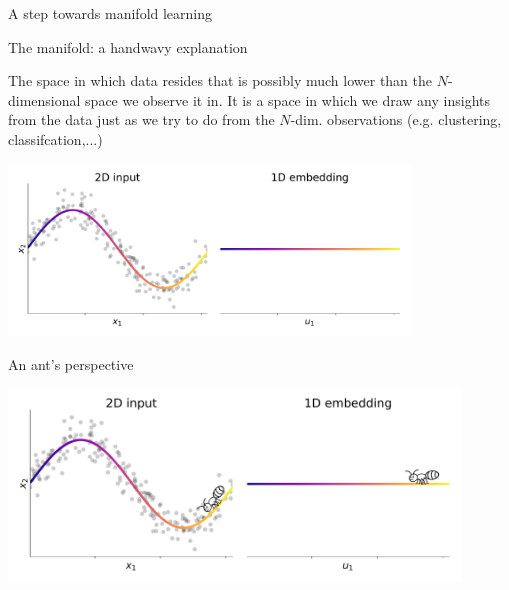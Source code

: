 \begin{frame}{A step towards manifold learning}

\begin{block}{The manifold: a handwavy explanation}

The space in which data resides that is possibly much lower than the $N$-dimensional space we observe it in.
It is a space in which we draw any insights from the data just as we try to do from the $N$-dim. observations (e.g. clustering, classifcation,...)

\end{block}

\pause

\begin{center}
	\includegraphics[width=0.8\textwidth]{img/sin_manifold}
\end{center}

\end{frame}

\begin{frame}{An ant's perspective}

\pause

\begin{center}
	\includegraphics[width=0.9\textwidth]{img/sin_manifold_ant}
\end{center}

\end{frame}

